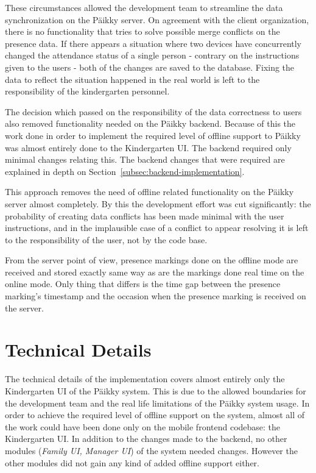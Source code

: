 These circumstances allowed the development team to streamline the data synchronization on the Päikky server. On agreement with the client organization, there is no functionality that tries to solve possible merge conflicts on the presence data. If there appears a situation where two devices have concurrently changed the attendance status of a single person - contrary on the instructions given to the users - both of the changes are saved to the database. Fixing the data to reflect the situation happened in the real world is left to the responsibility of the kindergarten personnel.

The decision which passed on the responsibility of the data correctness to users also removed functionality needed on the Päikky backend. Because of this the work done in order to implement the required level of offline support to Päikky was almost entirely done to the Kindergarten UI. The backend required only minimal changes relating this. The backend changes that were required are explained in depth on Section~\ref{subsec:backend-implementation}. 

This approach removes the need of offline related functionality on the Päikky server almost completely. By this the development effort was cut significantly: the probability of creating data conflicts has been made minimal with the user instructions, and in the implausible case of a conflict to appear resolving it is left to the responsibility of the user, not by the code base. 

From the server point of view, presence markings done on the offline mode are received and stored exactly same way as are the markings done real time on the online mode. Only thing that differs is the time gap between the presence marking's timestamp and the occasion when the presence marking is received on the server. 





\section{Technical Details}
The technical details of the implementation covers almost entirely only the Kindergarten UI of the Päikky system. This is due to the allowed boundaries for the development team and the real life limitations of the Päikky system usage. In order to achieve the required level of offline support on the system, almost all of the work could have been done only on the mobile frontend codebase: the Kindergarten UI. In addition to the changes made to the backend, no other modules (\textit{Family UI, Manager UI}) of the system needed changes. However the other modules did not gain any kind of added offline support either.


